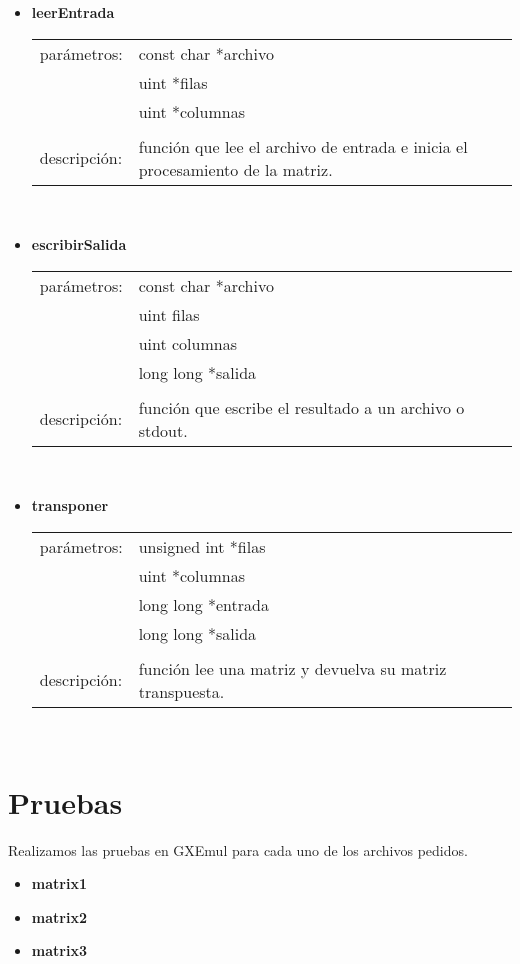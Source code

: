 \documentclass[a4paper]{article}
\begin{document}
\begin{itemize}
\item \textbf{leerEntrada}\\
	\begin{tabular}{ll}
    parámetros:     &const char *archivo\\
    				&uint *filas\\
                    &uint *columnas\\
    &\\
    descripción: &función que lee el archivo de entrada e inicia el procesamiento de la matriz.
    \end{tabular}\\
\item \textbf{escribirSalida}\\
	\begin{tabular}{ll}
    parámetros:     &const char *archivo\\
    				&uint filas\\
                    &uint columnas\\
                    &long long *salida\\
    &\\
    descripción: &función que escribe el resultado a un archivo o stdout.
    \end{tabular}\\
\item \textbf{transponer}\\
	\begin{tabular}{ll}
    parámetros:     &unsigned int *filas\\
                    &uint *columnas\\
                    &long long *entrada\\
                    &long long *salida\\
    &\\
    descripción: &función lee una matriz y devuelva su matriz transpuesta.
    \end{tabular}\\
\end{itemize}
\lstset{basicstyle=\footnotesize\ttfamily}

\section{Pruebas}
Realizamos las pruebas en GXEmul para cada uno de los archivos pedidos.
\begin{itemize}
\item \textbf{matrix1}
\item \textbf{matrix2}
\item \textbf{matrix3}
\end{itemize}
\end{document}
